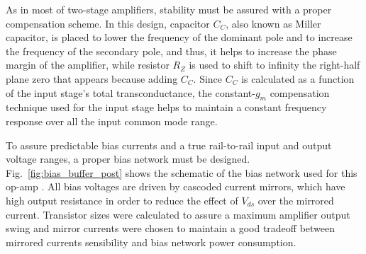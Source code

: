 As in most of two-stage amplifiers, stability must be assured with a proper compensation scheme. In this design, capacitor $C_C$, also known as Miller capacitor, is placed to lower the frequency of the dominant pole and to increase the frequency of the secondary pole, and thus, it helps to increase the phase margin of the amplifier, while resistor $R_Z$ is used to shift to infinity the right-half plane zero that appears because adding $C_C$. Since $C_C$ is calculated as a function of the input stage's total transconductance, the constant-$g_m$ compensation technique used for the input stage helps to maintain a constant frequency response over all the input common mode range.

To assure predictable bias currents and a true rail-to-rail input and output voltage ranges, a proper bias network must be designed. Fig.~\ref{fig:bias_buffer_post} shows the schematic of the bias network used for this op-amp \citep{baker101}. All bias voltages are driven by cascoded current mirrors, which have high output resistance in order to reduce the effect of $V_{ds}$ over the mirrored current. Transistor sizes were calculated to assure a maximum amplifier output swing and mirror currents were chosen to maintain a good tradeoff between mirrored currents sensibility and bias network power consumption. 

